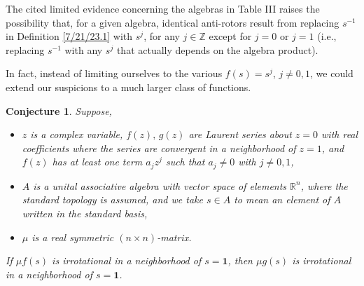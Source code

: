 \documentclass{amsart}
\numberwithin{equation}{section}
\newtheorem*{conjecture}{Conjecture}
\theoremstyle{definition}
\numberwithin{theorem}{section}
\begin{document}
The cited limited evidence concerning the algebras in Table III raises the possibility that, for a given algebra, identical anti-rotors result from replacing $s^{-1}$ in Definition \ref{7/21/23.1} with $s^j$, for any $j\in \mathbb{Z}$ except for $j = 0$ or $j=1$ (i.e., replacing $s^{-1}$ with any $s^j$ that actually depends on the algebra product). 


 In fact, instead of limiting ourselves to the various $f(s)=s^j$, $j\ne 0,1$, we could extend our suspicions to a much larger class of functions.  

\begin{conjecture} Suppose, \begin{itemize}\item $z$ is a complex variable, $f(z),\,g(z)$ are Laurent series about $z=0$ with real coefficients where the series are convergent in a neighborhood of $z=1$, and $f(z)$ has at least one term $a_j z^j$ such that $a_j\ne 0$ with $j\ne 0,1$,  
\item  $A$ is a unital associative algebra with vector space of elements $\mathbb{R}^n$, where the standard topology is assumed, and we take $s \in A$ to mean an element of $A$ written in the standard basis,
\item $\mu$ is a real symmetric $(n\times n)$-matrix. 
\end{itemize}
If $\mu f(s)$ is irrotational in a neighborhood of $s=\mathbf{1}$, then $\mu g(s)$ is irrotational in a neighborhood of $s=\mathbf{1}$.
\end{conjecture}
\end{document}
